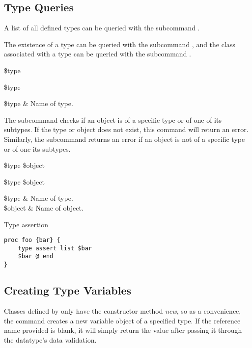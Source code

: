 \documentclass{article}
\begin{document}
\clearpage
\subsection{Type Queries}
A list of all defined types can be queried with the subcommand . 
\begin{syntax}
\end{syntax}

The existence of a type can be queried with the subcommand , and 
the class associated with a type can be queried with the subcommand . 
\begin{syntax}
 \$type
\end{syntax}
\begin{syntax}
 \$type
\end{syntax}
\begin{args}
\$type & Name of type. 
\end{args}

The subcommand  checks if an object is of a specific type or of one of its subtypes.
If the type or object does not exist, this command will return an error.
Similarly, the subcommand  returns an error if an object is not of a specific type or of one its subtypes.

\begin{syntax}
 \$type \$object
\end{syntax}
\begin{syntax}
 \$type \$object
\end{syntax}
\begin{args}
\$type & Name of type. \\
\$object & Name of object.
\end{args}

\begin{example}{Type assertion}
\begin{lstlisting}
proc foo {bar} {
    type assert list $bar
    $bar @ end
}
\end{lstlisting}
\end{example}

\clearpage
\subsection{Creating Type Variables}
Classes defined by  only have the constructor method \textit{new}, so as a convenience, the command  creates a new variable object of a specified type. If the reference name provided is blank, it will simply return the value after passing it through the datatype's data validation.
\end{document}

